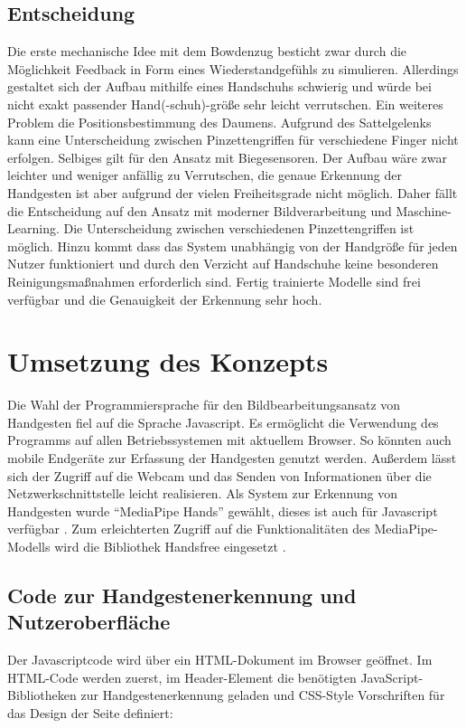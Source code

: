 \documentclass[a4paper,12pt,final]{article} %
\numberwithin{equation}{section} %
\numberwithin{figure}{section} %
\numberwithin{table}{section} %
\begin{document}
\subsection{Entscheidung}

Die erste mechanische Idee mit dem Bowdenzug besticht zwar durch die Möglichkeit Feedback in Form eines Wiederstandgefühls zu simulieren. Allerdings gestaltet sich der Aufbau mithilfe eines Handschuhs schwierig und würde bei nicht exakt passender Hand(-schuh)-größe sehr leicht verrutschen. Ein weiteres Problem die Positionsbestimmung des Daumens. Aufgrund des Sattelgelenks kann eine Unterscheidung zwischen Pinzetten\-griffen für verschiedene Finger nicht erfolgen. Selbiges gilt für den Ansatz mit Biege\-sensoren. Der Aufbau wäre zwar leichter und weniger anfällig zu Verrutschen, die genaue Erkennung der Handgesten ist aber aufgrund der vielen Freiheitsgrade nicht möglich.
Daher fällt die Entscheidung auf den Ansatz mit moderner Bildverarbeitung und Masch\-ine-Learning. Die Unterscheidung zwischen verschiedenen Pinzettengriffen ist möglich. Hinzu kommt dass das System unabhängig von der Handgröße für jeden Nutzer funk\-tio\-niert und durch den Verzicht auf Handschuhe keine besonderen Reinigungsmaßnahmen erforderlich sind. Fertig trainierte Modelle sind frei verfügbar und die Genauigkeit der Erkennung sehr hoch.


\newpage
\section{Umsetzung des Konzepts}

Die Wahl der Programmiersprache für den Bildbearbeitungsansatz von Handgesten fiel auf die Sprache Javascript. Es ermöglicht die Verwendung des Programms auf allen Betriebssystemen mit aktuellem Browser. So könnten auch mobile Endgeräte zur Er\-fass\-ung der Handgesten genutzt werden.
Außerdem lässt sich der Zugriff auf die Webcam und das Senden von Informationen über die Netzwerkschnittstelle leicht realisieren. 
Als System zur Erkennung von Handgesten wurde \enquote{MediaPipe Hands} gewählt, dieses ist auch für Javascript verfügbar \cite{MediaPipeHands}.
Zum erleichterten Zugriff auf die Funktionalitäten des MediaPipe-Modells wird die Bibliothek Handsfree eingesetzt \cite{Handsfree}.

\subsection{Code zur Handgestenerkennung und Nutzeroberfläche}
Der Javascriptcode wird über ein HTML-Dokument im Browser geöffnet.
Im HTML-Code werden zuerst, im Header-Element die benötigten JavaScript-Bibliotheken zur Handgestenerkennung geladen und CSS-Style Vorschriften für das Design der Seite de\-fi\-ni\-ert:
 
\end{document}
